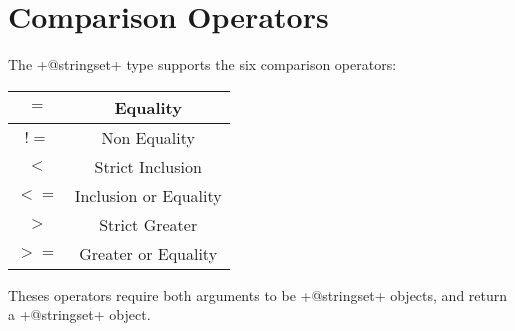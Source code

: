 \section{Comparison Operators}

The \ggs+@stringset+ type supports the six comparison operators:\newline

\begin{tabular}{|c|c|}
\hline
$=$ & Equality \\
\hline
$!=$ & Non Equality \\
\hline
$<$  & Strict Inclusion \\
\hline
$<=$  & Inclusion or Equality \\
\hline
$>$  & Strict Greater \\
\hline
$>=$  & Greater or Equality \\
\hline
\end{tabular}

Theses operators require both arguments to be \ggs+@stringset+ objects, and return a \ggs+@stringset+ object.


